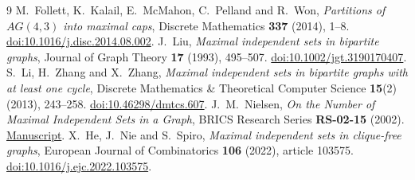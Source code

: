 \documentclass[12pt,a4paper]{article}
\begin{document}
\begin{thebibliography}{9}\small
{} M.~Follett, K.~Kalail, E.~McMahon, C.~Pelland and R.~Won, \emph{Partitions of $AG(4,3)$ into maximal caps}, Discrete Mathematics \textbf{337} (2014), 1--8. \href{https://doi.org/10.1016/j.disc.2014.08.002}{doi:10.1016/j.disc.2014.08.002}.
 J.~Liu, \emph{Maximal independent sets in bipartite graphs}, Journal of Graph Theory \textbf{17} (1993), 495--507. \href{https://doi.org/10.1002/jgt.3190170407}{doi:10.1002/jgt.3190170407}.
 S.~Li, H.~Zhang and X.~Zhang, \emph{Maximal independent sets in bipartite graphs with at least one cycle}, Discrete Mathematics \& Theoretical Computer Science \textbf{15}(2) (2013), 243--258. \href{https://doi.org/10.46298/dmtcs.607}{doi:10.46298/dmtcs.607}.
 J.~M.~Nielsen, \emph{On the Number of Maximal Independent Sets in a Graph}, BRICS Research Series \textbf{RS-02-15} (2002). \href{https://www.brics.dk/RS/02/15/BRICS-RS-02-15.pdf}{Manuscript}.
 X.~He, J.~Nie and S.~Spiro, \emph{Maximal independent sets in clique-free graphs}, European Journal of Combinatorics \textbf{106} (2022), article 103575. \href{https://doi.org/10.1016/j.ejc.2022.103575}{doi:10.1016/j.ejc.2022.103575}.
\end{thebibliography}
\end{document}
